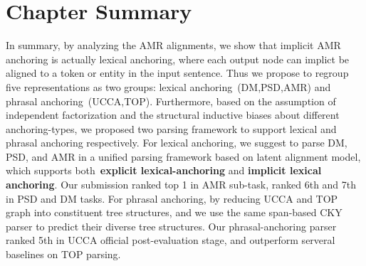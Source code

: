 \section{Chapter Summary}
\label{sec:conclusion}

In summary, by analyzing the AMR alignments, we show that implicit AMR
anchoring is actually lexical anchoring, where each output node can
implict be aligned to a token or entity in the input sentence. Thus we
propose to regroup five representations as two groups: lexical
anchoring~(DM,PSD,AMR) and phrasal anchoring~(UCCA,TOP). Furthermore,
based on the assumption of independent factorization and the
structural inductive biases about different anchoring-types, we
proposed two parsing framework to support lexical and phrasal
anchoring respectively.  For lexical anchoring, we suggest to parse
DM, PSD, and AMR in a unified parsing framework based on latent
alignment model, which supports both~\textbf{explicit
  lexical-anchoring} and \textbf{implicit lexical anchoring}. Our
submission ranked top 1 in AMR sub-task, ranked 6th and 7th in PSD and
DM tasks. For phrasal anchoring, by reducing UCCA and TOP graph into
constituent tree structures, and we use the same span-based CKY parser
to predict their diverse tree structures. Our phrasal-anchoring parser
ranked 5th in UCCA official post-evaluation stage, and outperform
serveral baselines on TOP parsing.

